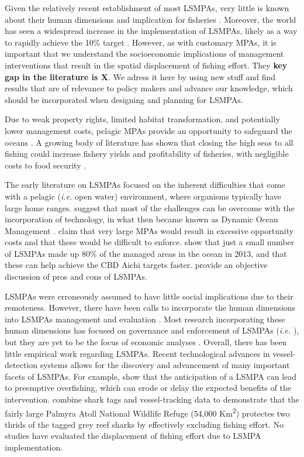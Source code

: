\documentclass[11pt,]{article}
\begin{document}
Given the relatively recent establishment of most LSMPAs, very little is
known about their human dimensions and implication for fisheries
\citep{gray_2017}. Moreover, the world has seen a widespread increase in
the implementation of LSMPAs, likely as a way to rapidly achieve the
10\% target \citep{boonzaier_2016,alger_2017,sala_2018}. However, as
with customary MPAs, it is important that we understand the
socioeconomic implications of management interventions that result in
the spatial displacement of fishing effort. They \textbf{key gap in the
literature is X}. We adress it here by using new stuff and find results
that are of relevance to policy makers and advance our knowledge, which
should be incorporated when designing and planning for LSMPAs.

Due to weak property rights, limited habitat transformation, and
potentially lower management costs, pelagic MPAs provide an opportunity
to safeguard the oceans \citet{game_2009}. A growing body of literature
has shown that closing the high seas to all fishing could increase
fishery yields and profitability of fisheries, with negligible costs to
food security \citep{white_2014,sumaila_2015,sala_2018a,schiller_2018}.

The early literature on LSMPAs focused on the inherent difficulties that
come with a pelagic (\emph{i.e.} open water) environment, where
organisms typically have large home ranges. \citet{game_2009} suggest
that most of the challenges can be overcome with the incorporation of
technology, in what then became known as Dynamic Ocean Management
\citep{maxwell_2015}. \citet{kaplan_2009} claim that very large MPAs
would result in excessive opportunity costs and that these would be
difficult to enforce. \citet{toonen_2013} show that just a small number
of LSMPAs made up 80\% of the managed areas in the ocean in 2013, and
that these can help achieve the CBD Aichi targets faster.
\citet{singleton_2014} provide an objective discussion of pros and cons
of LSMPAs.

LSMPAs were erroneously assumed to have little social implications due
to their remoteness. However, there have been calls to incorporate the
human dimensions into LSMPAs management and evaluation
\citep{agardy_2011,gray_2017}. Most research incorporating these human
dimensions has focused on governance and enforcement of LSMPAs
(\emph{i.e.} \citet{alger_2017,christie_2017}), but they are yet to be
the focus of economic analyses \citep{gray_2017}. Overall, there has
been little empirical work regarding LSMPAs. Recent technological
advances in vessel-detection systems allows for the discovery and
advancement of many important facets of LSMPAs. For example,
\citep{mcdermott_2018} show that the anticipation of a LSMPA can lead to
preemptive overfishing, which can erode or delay the expected benefits
of the intervention. \citet{white_2017} combine shark tags and
vessel-tracking data to demonstrate that the fairly large Palmyra Atoll
National Wildlife Refuge (54,000 Km\textsuperscript{2}) protectes two
thrids of the tagged grey reef sharks by effectively excluding fishing
effort. No studies have evaluated the displacement of fishing effort due
to LSMPA implementation.
\end{document}
